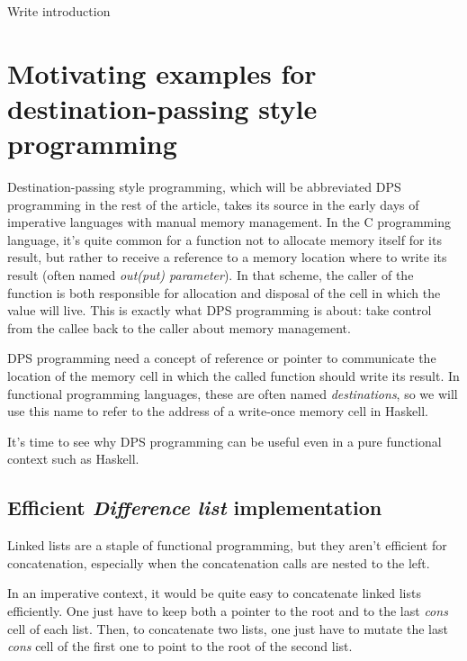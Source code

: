 \documentclass[english]{jflart}
\newcommand{\TODO}[1]{{\color{red}\large #1}}
\begin{document}
\TODO{Write introduction}


\section{Motivating examples for destination-passing style programming}

Destination-passing style programming, which will be abbreviated DPS programming in the rest of the article, takes its source in the early days of imperative languages with manual memory management. In the C programming language, it's quite common for a function not to allocate memory itself for its result, but rather to receive a reference to a memory location where to write its result (often named \emph{out(put) parameter}). In that scheme, the caller of the function is both responsible for allocation and disposal of the cell in which the value will live. This is exactly what DPS programming is about: take control from the callee back to the caller about memory management.

DPS programming need a concept of reference or pointer to communicate the location of the memory cell in which the called function should write its result. In functional programming languages, these are often named \emph{destinations}, so we will use this name to refer to the address of a write-once memory cell in Haskell.

It's time to see why DPS programming can be useful even in a pure functional context such as Haskell.

\subsection{Efficient \emph{Difference list} implementation}

Linked lists are a staple of functional programming, but they aren't efficient for concatenation, especially when the concatenation calls are nested to the left.

In an imperative context, it would be quite easy to concatenate linked lists efficiently. One just have to keep both a pointer to the root and to the last \emph{cons} cell of each list. Then, to concatenate two lists, one just have to mutate the last \emph{cons} cell of the first one to point to the root of the second list.
\end{document}

